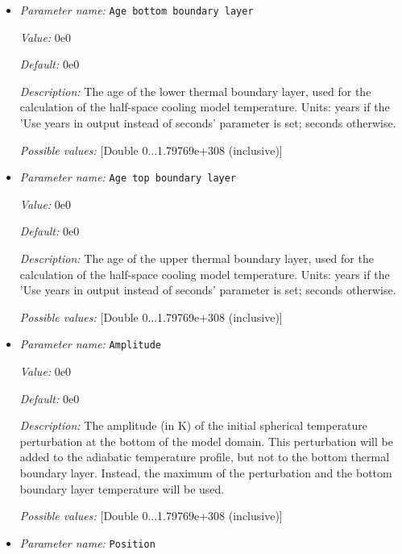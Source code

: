 \begin{itemize}
\item {\it Parameter name:} {\tt Age bottom boundary layer}
\label{parameters:Initial conditions/Adiabatic/Age bottom boundary layer}


{\it Value:} 0e0


{\it Default:} 0e0


{\it Description:} The age of the lower thermal boundary layer, used for the calculation of the half-space cooling model temperature. Units: years if the 'Use years in output instead of seconds' parameter is set; seconds otherwise.


{\it Possible values:} [Double 0...1.79769e+308 (inclusive)]
\item {\it Parameter name:} {\tt Age top boundary layer}
\label{parameters:Initial conditions/Adiabatic/Age top boundary layer}


{\it Value:} 0e0


{\it Default:} 0e0


{\it Description:} The age of the upper thermal boundary layer, used for the calculation of the half-space cooling model temperature. Units: years if the 'Use years in output instead of seconds' parameter is set; seconds otherwise.


{\it Possible values:} [Double 0...1.79769e+308 (inclusive)]
\item {\it Parameter name:} {\tt Amplitude}
\label{parameters:Initial conditions/Adiabatic/Amplitude}


{\it Value:} 0e0


{\it Default:} 0e0


{\it Description:} The amplitude (in K) of the initial spherical temperature perturbation at the bottom of the model domain. This perturbation will be added to the adiabatic temperature profile, but not to the bottom thermal boundary layer. Instead, the maximum of the perturbation and the bottom boundary layer temperature will be used.


{\it Possible values:} [Double 0...1.79769e+308 (inclusive)]
\item {\it Parameter name:} {\tt Position}
\label{parameters:Initial conditions/Adiabatic/Position}



\end{itemize}
